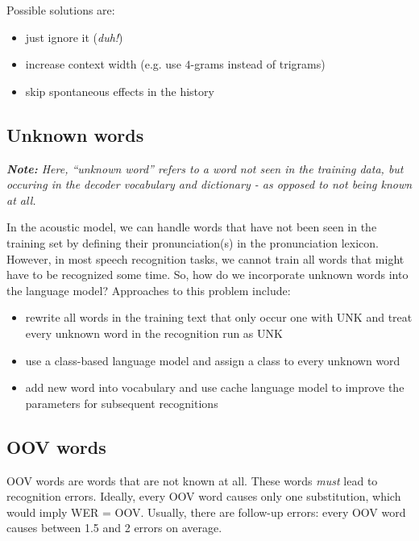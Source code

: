 Possible solutions are:
\begin{itemize}
    \item just ignore it (\textit{duh!})
    \item increase context width (e.g. use $4$-grams instead of trigrams)
    \item skip spontaneous effects in the history
\end{itemize}

\subsection{Unknown words}

\vspace{5pt}
\textit{\textbf{Note:} Here, ``unknown word'' refers to a word not seen in the training data, but occuring in the decoder vocabulary and dictionary - as opposed to not being known at all.}
\vspace{10pt}

In the acoustic model, we can handle words that have not been seen in the training set by defining their pronunciation(s) in the pronunciation lexicon. However, in most speech recognition tasks, we cannot train all words that might have to be recognized some time. So, how do we incorporate unknown words into the language model? 
Approaches to this problem include:
\begin{itemize}
    \item rewrite all words in the training text that only occur one with UNK and treat every unknown word in the recognition run as UNK
    \item use a class-based language model and assign a class to every unknown word
    \item add new word into vocabulary and use cache language model to improve the parameters for subsequent recognitions
\end{itemize}

\subsection{OOV words}
OOV words are words that are not known at all. These words \textit{must} lead to recognition errors. Ideally, every OOV word causes only one substitution, which would imply WER = OOV. Usually, there are follow-up errors: every OOV word causes between 1.5 and 2 errors on average.

